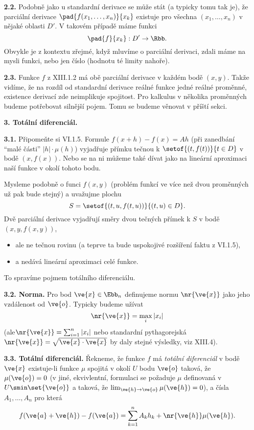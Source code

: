 \documentclass[12pt]{article}
\begin{document}
{{\bf 2.2.} Podobně jako u standardní derivace se může stát (a typicky tomu tak je), že parciální derivace 
$\pad{f(x_1,\dots,x_n)}{x_k}$ existuje pro všechna $(x_1,\dots,x_n)$ v nějaké oblasti
$D'$. V takovém případě máme funkci
$$ 
\pad{f}{x_k}:D'\to\Rbb.
$$
Obvykle je z kontextu zřejmé,  když mluvíme o parciální derivaci, zdali máme na mysli funkci, nebo jen číslo  (hodnotu té limity nahoře).

\bigskip

{\bf 2.3.} Funkce $f$ z XIII.1.2 má obě parciální derivace v každém bodě $(x,y)$. Takže vidíme, že na rozdíl od standardní derivace reálné funkce jedné reálné proměnné, existence derivací zde neimplikuje spojitost. Pro kalkulus v několika proměnných budeme potřebovat silnější pojem. Tomu se budeme věnovat v příští sekci.



\vskip10mm
 
  
 {\large\bf 3. Totální diferenciál.}
 
 \bigskip
 


{\bf 3.1.}  Připomeňte si  VI.1.5. Formule $f(x+h)-f(x)=Ah$ (při zanedbání ``malé části'' $|h|\cdot\mu(h)$)
vyjadřuje přímku tečnou k $\setof{(t,f(t))}{t\in D}$ v bodě $(x,f(x))$. Nebo se na ni můžeme také dívat jako na lineární aproximaci naší funkce v okolí tohoto bodu.

Mysleme podobně o funci $f(x,y)$  (problém funkcí ve více než dvou proměnných už pak bude stejný) a uvažujme plochu 
$$
S=\setof{(t,u,f(t,u))}{(t,u)\in D}.
$$
Dvě parciální derivace vyjadřují směry dvou  tečných přímek k $S$ v bodě $(x,y,f(x,y))$, 
\begin{itemize}
\item ale ne tečnou rovinu (a teprve ta bude uspokojivé rozšíření faktu z VI.1.5),
\item a nedává lineární aproximaci celé funkce.
\end{itemize}
To spravíme pojmem totálního diferenciálu.

\bigskip

{\bf 3.2. Norma.} Pro bod $\ve{x}\in\Ebb_n$ definujeme normu $\nr{\ve{x}}$ jako jeho vzdálenost 
od $\ve{o}$. Typicky budeme užívat
$$
\nr{\ve{x}}=\max_i|x_i|
$$
(ale$\nr{\ve{x}}=\sum_{i=1}^n|x_i|$ nebo standardní pythagorejská $\nr{\ve{x}}=\sqrt{{\ve{x}}\cdot{\ve{x}}}$ by daly stejné výsledky, viz XIII.4).

\bigskip

{\bf 3.3. Totální diferenciál.} Řekneme, že funkce $f$ má {\em totální diferenciál} v bodě  $\ve{x}$ existuje-li funkce $\mu$ spojitá v okolí
 $U$ bodu  $\ve{o}$ taková, že $\mu(\ve{o})=0$ 
(v jiné, ekvivlentní, formulaci se požaduje $\mu$ definovaná v
$U\smin\set{\ve{o}}$ 
a taková, že $\lim_{\ve{h}\to\ve{o}}\mu(\ve{h})=0$),
a čísla $A_1,\dots,A_n$ pro která
$$
f(\ve{a}+\ve{h})-f(\ve{a})=\sum_{k=1}^nA_kh_k+\nr{\ve{h}}\mu(\ve{h}) .
$$

}
\end{document}
